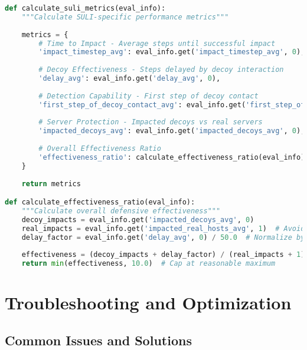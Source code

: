 \documentclass[12pt,a4paper]{article}
\begin{document}
\begin{lstlisting}[language=Python, caption=SULI Evaluation Metrics]
def calculate_suli_metrics(eval_info):
    """Calculate SULI-specific performance metrics"""
    
    metrics = {
        # Time to Impact - Average steps until successful impact
        'impact_timestep_avg': eval_info.get('impact_timestep_avg', 0),
        
        # Decoy Effectiveness - Steps delayed by decoy interaction
        'delay_avg': eval_info.get('delay_avg', 0),
        
        # Detection Capability - First step of decoy contact
        'first_step_of_decoy_contact_avg': eval_info.get('first_step_of_decoy_contact_avg', 0),
        
        # Server Protection - Impacted decoys vs real servers
        'impacted_decoys_avg': eval_info.get('impacted_decoys_avg', 0),
        
        # Overall Effectiveness Ratio
        'effectiveness_ratio': calculate_effectiveness_ratio(eval_info)
    }
    
    return metrics

def calculate_effectiveness_ratio(eval_info):
    """Calculate overall defensive effectiveness"""
    decoy_impacts = eval_info.get('impacted_decoys_avg', 0)
    real_impacts = eval_info.get('impacted_real_hosts_avg', 1)  # Avoid division by zero
    delay_factor = eval_info.get('delay_avg', 0) / 50.0  # Normalize by episode length
    
    effectiveness = (decoy_impacts + delay_factor) / (real_impacts + 1)
    return min(effectiveness, 10.0)  # Cap at reasonable maximum
\end{lstlisting}

\section{Troubleshooting and Optimization}

\subsection{Common Issues and Solutions}
\end{document}
